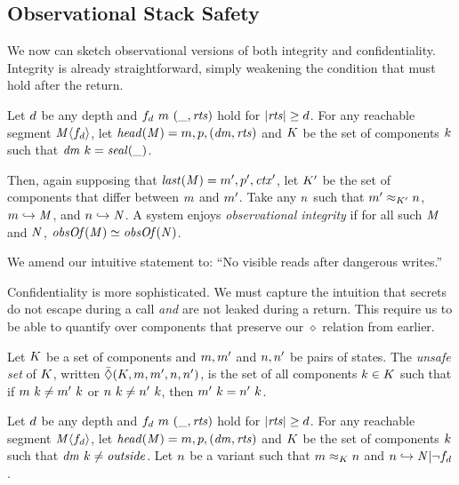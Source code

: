 \documentclass[acmsmall,review,anonymous]{acmart}\settopmatter{printfolios=true,printccs=false,printacmref=false}
\begin{document}
\subsection{Observational Stack Safety}

We now can sketch observational versions of both integrity and confidentiality.
Integrity is already straightforward, simply weakening the condition that must hold
after the return.

 Let \(d\) be any depth and \(f_d ~ m ~ (\_, \mathit{rts})\) hold for
\(|\mathit{rts}| \geq d\). For any reachable segment \(\mathit{M} \langle f_d \rangle\),
let \(\mathit{head}(\mathit{M}) = m,p,(\mathit{dm},\mathit{rts})\) and
\(K\) be the set of components \(k\) such that \(\mathit{dm} ~ k = \mathit{seal(\_)}\).

Then, again supposing that \(\mathit{last}(\mathit{M}) = m',p',\mathit{ctx}'\),
let \(K'\) be the set of components that differ
between \(m\) and \(m'\). Take any \(n\) such that
\(m' \approx_{K'} n\), \(m \hookrightarrow \mathit{M}\), and
\(n \hookrightarrow \mathit{N}\). A system enjoys
{\em observational integrity} if for all such \(\mathit{M}\) and \(\mathit{N}\),
\(\mathit{obsOf}(\mathit{M}) \simeq \mathit{obsOf}(\mathit{N})\).

We amend our intuitive statement to: ``No visible reads after dangerous writes.''

Confidentiality is more sophisticated. We must capture the intuition that
secrets do not escape during a call {\em and} are not leaked during a return.
This require us to be able to quantify over components that preserve our \(\diamond\)
relation from earlier.

 Let \(K\) be a set of components and \(m,m'\) and \(n,n'\)
be pairs of states. The {\em unsafe set} of \(K\), written
\(\bar{\Diamond}(K,m,m',n,n')\), is the set of all components
\(k \in K\) such that if
\(m ~ k \not = m' ~ k\) or
\(n ~ k \not = n' ~ k\), then
\(m' ~ k = n' ~ k\).

 Let \(d\) be any depth and \(f_d ~ m ~ (\_, \mathit{rts})\) hold for
\(|\mathit{rts}| \geq d\). For any reachable segment \(\mathit{M} \langle f_d \rangle\),
let \(\mathit{head}(\mathit{M}) = m,p,(\mathit{dm},\mathit{rts})\) and
\(K\) be the set of components \(k\) such that \(\mathit{dm} ~ k \not = \mathit{outside}\).
Let \(n\) be a variant such that \(m \approx_K n\) and
\(n \hookrightarrow \mathit{N} | \neg f_d \).
\end{document}
